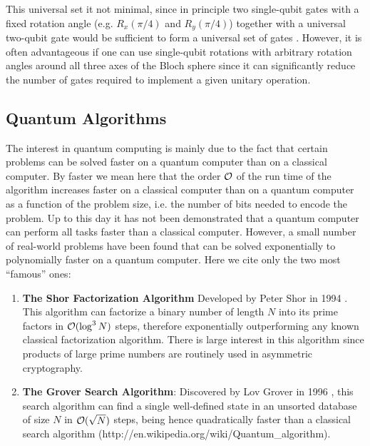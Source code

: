 This universal set it not minimal, since in principle two single-qubit gates with a fixed rotation angle (e.g. $R_x(\pi/4)$ and $R_y(\pi/4)$) together with a universal two-qubit gate would be sufficient to form a universal set of gates \citep{dawson_solovay-kitaev_2005}. However, it is often advantageous if one can use single-qubit rotations with arbitrary rotation angles around all three axes of the Bloch sphere since it can significantly reduce the number of gates required to implement a given unitary operation.

\subsection{Quantum Algorithms}

The interest in quantum computing is mainly due to the fact that certain problems can be solved faster on a quantum computer than on a classical computer. By faster we mean here that the order $\cal{O}$ of the run time of the algorithm increases faster on a classical computer than on a quantum computer as a function of the problem size, i.e. the number of bits needed to encode the problem. Up to this day it has not been demonstrated that a quantum computer can perform all tasks faster than a classical computer. However, a small number of real-world problems have been found that can be solved exponentially to polynomially faster on a quantum computer. Here we cite only the two most ``famous'' ones:

\begin{enumerate}
\item \textbf{The Shor Factorization Algorithm} Developed by Peter Shor in 1994 \citep{shor_algorithms_1994,shor_polynomial-time_1995}. This algorithm can factorize a binary number of length $N$ into its prime factors in $\begin{mathcal}O\end{mathcal}(\log^3{N})$ steps, therefore exponentially outperforming any known classical factorization algorithm. There is large interest in this algorithm since products of large prime numbers are routinely used in asymmetric cryptography.
\item \textbf{The Grover Search Algorithm}: Discovered by Lov Grover in 1996 \citep{grover_fast_1996}, this search algorithm can find a single well-defined state in an unsorted database of size $N$ in $\begin{mathcal}O\end{mathcal}(\sqrt{N})$ steps, being hence quadratically faster than a classical search algorithm (http://en.wikipedia.org/wiki/Quantum\_algorithm).
\end{enumerate}

